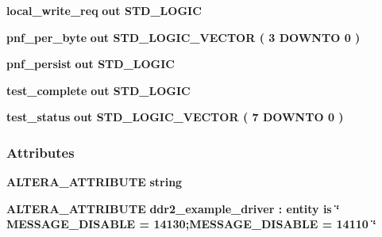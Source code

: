 \begin{DoxyCompactItemize}
\item 
{\bf local\+\_\+write\+\_\+req}  {\bfseries {\bfseries \textcolor{keywordflow}{out}\textcolor{vhdlchar}{ }}} {\bfseries \textcolor{comment}{S\+T\+D\+\_\+\+L\+O\+G\+IC}\textcolor{vhdlchar}{ }} 
\item 
{\bf pnf\+\_\+per\+\_\+byte}  {\bfseries {\bfseries \textcolor{keywordflow}{out}\textcolor{vhdlchar}{ }}} {\bfseries \textcolor{comment}{S\+T\+D\+\_\+\+L\+O\+G\+I\+C\+\_\+\+V\+E\+C\+T\+OR}\textcolor{vhdlchar}{ }\textcolor{vhdlchar}{(}\textcolor{vhdlchar}{ }\textcolor{vhdlchar}{ } \textcolor{vhdldigit}{3} \textcolor{vhdlchar}{ }\textcolor{keywordflow}{D\+O\+W\+N\+TO}\textcolor{vhdlchar}{ }\textcolor{vhdlchar}{ } \textcolor{vhdldigit}{0} \textcolor{vhdlchar}{ }\textcolor{vhdlchar}{)}\textcolor{vhdlchar}{ }} 
\item 
{\bf pnf\+\_\+persist}  {\bfseries {\bfseries \textcolor{keywordflow}{out}\textcolor{vhdlchar}{ }}} {\bfseries \textcolor{comment}{S\+T\+D\+\_\+\+L\+O\+G\+IC}\textcolor{vhdlchar}{ }} 
\item 
{\bf test\+\_\+complete}  {\bfseries {\bfseries \textcolor{keywordflow}{out}\textcolor{vhdlchar}{ }}} {\bfseries \textcolor{comment}{S\+T\+D\+\_\+\+L\+O\+G\+IC}\textcolor{vhdlchar}{ }} 
\item 
{\bf test\+\_\+status}  {\bfseries {\bfseries \textcolor{keywordflow}{out}\textcolor{vhdlchar}{ }}} {\bfseries \textcolor{comment}{S\+T\+D\+\_\+\+L\+O\+G\+I\+C\+\_\+\+V\+E\+C\+T\+OR}\textcolor{vhdlchar}{ }\textcolor{vhdlchar}{(}\textcolor{vhdlchar}{ }\textcolor{vhdlchar}{ } \textcolor{vhdldigit}{7} \textcolor{vhdlchar}{ }\textcolor{keywordflow}{D\+O\+W\+N\+TO}\textcolor{vhdlchar}{ }\textcolor{vhdlchar}{ } \textcolor{vhdldigit}{0} \textcolor{vhdlchar}{ }\textcolor{vhdlchar}{)}\textcolor{vhdlchar}{ }} 
\end{DoxyCompactItemize}
\subsubsection*{Attributes}
 \begin{DoxyCompactItemize}
\item 
{\bf A\+L\+T\+E\+R\+A\+\_\+\+A\+T\+T\+R\+I\+B\+U\+TE} {\bfseries \textcolor{comment}{string}\textcolor{vhdlchar}{ }} 
\item 
{\bf A\+L\+T\+E\+R\+A\+\_\+\+A\+T\+T\+R\+I\+B\+U\+TE} {\bfseries \textcolor{vhdlchar}{ddr2\+\_\+example\+\_\+driver}\textcolor{vhdlchar}{ }\textcolor{vhdlchar}{\+:}\textcolor{vhdlchar}{ }\textcolor{keywordflow}{entity}\textcolor{vhdlchar}{ }\textcolor{keywordflow}{is}\textcolor{vhdlchar}{ }\textcolor{vhdlchar}{ }\textcolor{vhdlchar}{ }\textcolor{vhdlchar}{ }\textcolor{keyword}{\char`\"{} M\+E\+S\+S\+A\+G\+E\+\_\+\+D\+I\+S\+A\+B\+L\+E = 14130;\+M\+E\+S\+S\+A\+G\+E\+\_\+\+D\+I\+S\+A\+B\+L\+E = 14110 \char`\"{}}\textcolor{vhdlchar}{ }} 
\end{DoxyCompactItemize}


